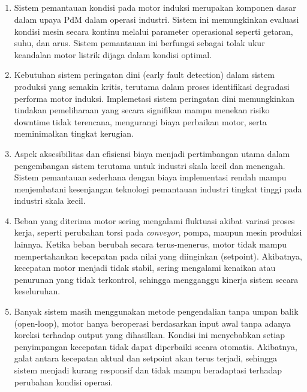 \documentclass{elsinta}
\begin{document}
\subsection{\ProjectUrgencyTitle}
\begin{enumerate}
    \item Sistem pemantauan kondisi pada motor induksi merupakan komponen dasar dalam upaya PdM dalam operasi industri. Sistem ini memungkinkan evaluasi kondisi mesin secara kontinu melalui parameter operasional seperti getaran, suhu, dan arus. Sistem pemantauan ini berfungsi sebagai tolak ukur keandalan motor listrik dijaga dalam kondisi optimal.
    \item Kebutuhan sistem peringatan dini (early fault detection) dalam sistem produksi yang semakin kritis, terutama dalam proses identifikasi degradasi performa motor induksi. Implemetasi sistem peringatan dini memungkinkan tindakan pemeliharaan yang secara signifikan mampu menekan risiko downtime tidak terencana, mengurangi biaya perbaikan motor, serta meminimalkan tingkat kerugian.
    \item Aspek aksesibilitas dan efisiensi biaya menjadi pertimbangan utama dalam pengembangan sistem terutama untuk industri skala kecil dan menengah. Sistem pemantauan sederhana dengan biaya implementasi rendah mampu menjembatani kesenjangan teknologi pemantauan industri tingkat tinggi pada industri skala kecil.
    \item Beban yang diterima motor sering mengalami fluktuasi akibat variasi proses kerja, seperti perubahan torsi pada \textit{conveyor}, pompa, maupun mesin produksi lainnya. Ketika beban berubah secara terus-menerus, motor tidak mampu mempertahankan kecepatan pada nilai yang diinginkan (setpoint). Akibatnya, kecepatan motor menjadi tidak stabil, sering mengalami kenaikan atau penurunan yang tidak terkontrol, sehingga mengganggu kinerja sistem secara keseluruhan.
    \item Banyak sistem masih menggunakan metode pengendalian tanpa umpan balik (open-loop), motor hanya beroperasi berdasarkan input awal tanpa adanya koreksi terhadap output yang dihasilkan. Kondisi ini menyebabkan setiap penyimpangan kecepatan tidak dapat diperbaiki secara otomatis. Akibatnya, galat antara kecepatan aktual dan setpoint akan terus terjadi, sehingga sistem menjadi kurang responsif dan tidak mampu beradaptasi terhadap perubahan kondisi operasi.
\end{enumerate}
\end{document}
